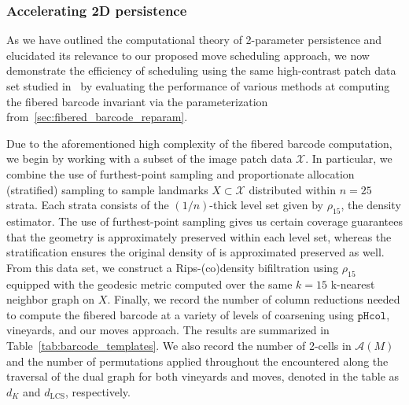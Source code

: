 \documentclass[sn-mathphys]{sn-jnl}
\begin{document}
\subsubsection{Accelerating 2D persistence}\label{sec:empirical_klein}
As we have outlined the computational theory of 2-parameter persistence and elucidated its relevance to our proposed move scheduling approach, we now demonstrate the efficiency of scheduling using the same high-contrast patch data set studied in~\cite{lee2003nonlinear} by evaluating the performance of various methods at computing the fibered barcode invariant via the parameterization from~\ref{sec:fibered_barcode_reparam}. 

Due to the aforementioned high complexity of the fibered barcode computation, we begin by working with a subset of the image patch data $\mathcal{X}$. 
In particular, we combine the use of furthest-point sampling and proportionate allocation (stratified) sampling to sample landmarks $X \subset \mathcal{X}$ distributed within $n = 25$ strata. Each strata consists of the $(1/n)$-thick level set given by $\rho_{15}$, the density estimator. The use of furthest-point sampling gives us certain coverage guarantees that the geometry is approximately preserved within each level set, whereas the stratification ensures the original density of is approximated preserved as well. 
From this data set, we construct a Rips-(co)density bifiltration using $\rho_{15}$ equipped with the geodesic metric computed over the same $k = 15$ k-nearest neighbor graph on $X$. 
Finally, we record the number of column reductions needed to compute the fibered barcode at a variety of levels of coarsening using $\mathtt{pHcol}$, vineyards, and our moves approach. The results are summarized in Table~\ref{tab:barcode_templates}. We also record the number of 2-cells in $\mathcal{A}(M)$ and the number of permutations applied throughout the encountered along the traversal of the dual graph for both vineyards and moves, denoted in the table as $d_K$ and $d_{\mathrm{LCS}}$, respectively. 
\end{document}
